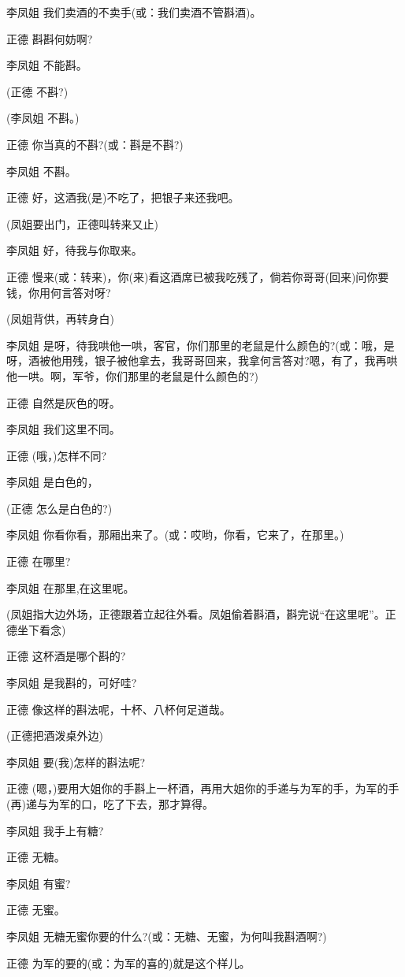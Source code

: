 李凤姐 我们卖酒的不卖手(或：我们卖酒不管斟酒)。

正德 斟斟何妨啊?

李凤姐 不能斟。

(正德 不斟?)

(李凤姐 不斟。)

正德 你当真的不斟?(或：斟是不斟?)

李凤姐 不斟。

正德 好，这酒我(是)不吃了，把银子来还我吧。

(凤姐要出门，正德叫转来又止)

李凤姐 好，待我与你取来。

正德
慢来(或：转来)，你(来)看这酒席已被我吃残了，倘若你哥哥(回来)问你要钱，你用何言答对呀?

(凤姐背供，再转身白)

李凤姐
是呀，待我哄他一哄，客官，你们那里的老鼠是什么颜色的?(或：哦，是呀，酒被他用残，银子被他拿去，我哥哥回来，我拿何言答对?嗯，有了，我再哄他一哄。啊，军爷，你们那里的老鼠是什么颜色的?)

正德 自然是灰色的呀。

李凤姐 我们这里不同。

正德 (哦，)怎样不同?

李凤姐 是白色的，

(正德 怎么是白色的?)

李凤姐 你看你看，那厢出来了。(或：哎哟，你看，它来了，在那里。)

正德 在哪里?

李凤姐 在那里,在这里呢。

(凤姐指大边外场，正德跟着立起往外看。凤姐偷着斟酒，斟完说``在这里呢''。正德坐下看念)

正德 这杯酒是哪个斟的?

李凤姐 是我斟的，可好哇?

正德 像这样的斟法呢，十杯、八杯何足道哉。

(正德把酒泼桌外边)

李凤姐 要(我)怎样的斟法呢?

正德
(嗯，)要用大姐你的手斟上一杯酒，再用大姐你的手递与为军的手，为军的手(再)递与为军的口，吃了下去，那才算得。

李凤姐 我手上有糖?

正德 无糖。

李凤姐 有蜜?

正德 无蜜。

李凤姐 无糖无蜜你要的什么?(或：无糖、无蜜，为何叫我斟酒啊?)

正德 为军的要的(或：为军的喜的)就是这个样儿。

